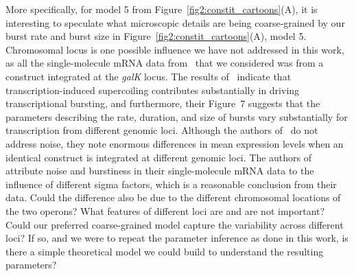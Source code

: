 More specifically, for model 5 from Figure~\ref{fig2:constit_cartoons}(A), it is
interesting to speculate what microscopic details are being coarse-grained by
our burst rate and burst size in Figure~\ref{fig2:constit_cartoons}(A), model 5.
Chromosomal locus is one possible influence we have not addressed in this work,
as all the single-molecule mRNA data from~\cite{Jones2014} that we considered
was from a construct integrated at the \textit{galK} locus. The results
of~\cite{Chong2014} indicate that transcription-induced supercoiling contributes
substantially in driving transcriptional bursting, and furthermore, their
Figure~7 suggests that the parameters describing the rate, duration, and size of
bursts vary substantially for transcription from different genomic loci.
Although the authors of~\cite{Englaender2017} do not address noise, they note
enormous differences in mean expression levels when an identical construct is
integrated at different genomic loci. The authors of~\cite{Engl2020} attribute
noise and burstiness in their single-molecule mRNA data to the influence of
different sigma factors, which is a reasonable conclusion from their data. Could
the difference also be due to the different chromosomal locations of the two
operons? What features of different loci are and are not important? Could our
preferred coarse-grained model capture the variability across different loci? If
so, and we were to repeat the parameter inference as done in this work, is there
a simple theoretical model we could build to understand the resulting
parameters?

